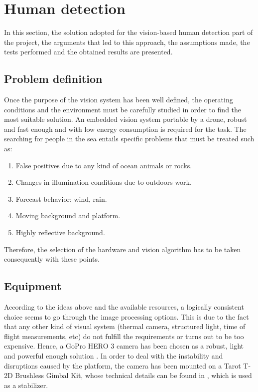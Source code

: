 \chapter{Human detection}
\label{sec:vision}
In this section, the solution adopted for the vision-based human detection part of the project,
the arguments that led to this approach, the assumptions made,
the tests performed and the obtained results are presented. 

\section{Problem definition}
Once the purpose of the vision system has been well defined,
the operating conditions and the environment must be carefully studied in order to find the most suitable solution.
An embedded vision system portable by a drone, robust and fast enough and with low energy consumption is required for the task. 
The searching for people in the sea entails specific problems that must be treated such as:

\begin{enumerate}[itemsep=1mm,topsep=1mm,leftmargin=.35in]
    \label{list: problem_def}
    \item False positives due to any kind of ocean animals or rocks.
    \item Changes in illumination conditions due to outdoors work.
    \item Forecast behavior: wind, rain.
    \item Moving background and platform.
    \item Highly reflective background.
\end{enumerate}%

Therefore, the selection of the hardware and vision algorithm has to be taken consequently with these points.

\section{Equipment}
According to the ideas above and the available resources,
a logically consistent choice seems to go through the image processing options. 
This is due to the fact that any other kind of visual system
(thermal camera, structured light, time of flight measurements, etc) do not fulfill the requirements or turns out to be too expensive.
Hence, a GoPro HERO 3 camera has been chosen as a robust, light and powerful enough solution \cite{ref:GoPro}.
In order to deal with the instability and disruptions caused by the platform,
the camera has been mounted on a Tarot T-2D Brushless Gimbal Kit, whose technical details
can be found in \cite{Ref:Gimbal}, which is used as a stabilizer.

